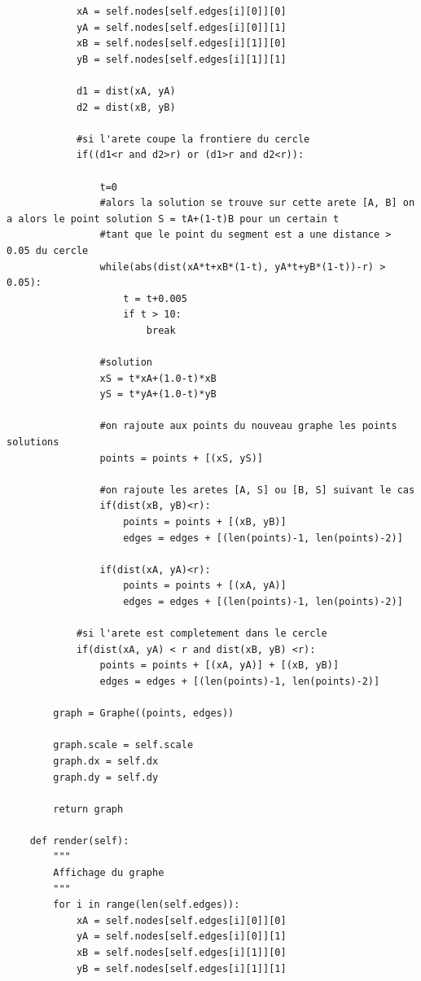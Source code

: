 \documentclass{book}
\begin{document}
\begin{appendices}
\begin{lstlisting}
            xA = self.nodes[self.edges[i][0]][0]
            yA = self.nodes[self.edges[i][0]][1]
            xB = self.nodes[self.edges[i][1]][0]
            yB = self.nodes[self.edges[i][1]][1]
            
            d1 = dist(xA, yA) 
            d2 = dist(xB, yB)
            
            #si l'arete coupe la frontiere du cercle            
            if((d1<r and d2>r) or (d1>r and d2<r)):
                
                t=0
                #alors la solution se trouve sur cette arete [A, B] on a alors le point solution S = tA+(1-t)B pour un certain t
                #tant que le point du segment est a une distance > 0.05 du cercle
                while(abs(dist(xA*t+xB*(1-t), yA*t+yB*(1-t))-r) > 0.05):
                    t = t+0.005
                    if t > 10:
                        break
                
                #solution
                xS = t*xA+(1.0-t)*xB
                yS = t*yA+(1.0-t)*yB
                
                #on rajoute aux points du nouveau graphe les points solutions
                points = points + [(xS, yS)]
                
                #on rajoute les aretes [A, S] ou [B, S] suivant le cas
                if(dist(xB, yB)<r):
                    points = points + [(xB, yB)]
                    edges = edges + [(len(points)-1, len(points)-2)]
                
                if(dist(xA, yA)<r):
                    points = points + [(xA, yA)]
                    edges = edges + [(len(points)-1, len(points)-2)]
            
            #si l'arete est completement dans le cercle
            if(dist(xA, yA) < r and dist(xB, yB) <r):
                points = points + [(xA, yA)] + [(xB, yB)]
                edges = edges + [(len(points)-1, len(points)-2)]
                
        graph = Graphe((points, edges))
        
        graph.scale = self.scale
        graph.dx = self.dx
        graph.dy = self.dy
        
        return graph

    def render(self):
        """
        Affichage du graphe
        """
        for i in range(len(self.edges)):
            xA = self.nodes[self.edges[i][0]][0]
            yA = self.nodes[self.edges[i][0]][1]
            xB = self.nodes[self.edges[i][1]][0]
            yB = self.nodes[self.edges[i][1]][1]
            

\end{lstlisting}
\end{appendices}
\end{document}
